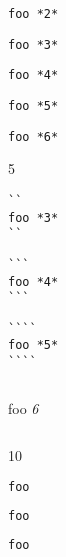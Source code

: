 
\def\mytitle{Advanced Fenced Code Blocks}


\texttt{foo *2*}

\begin{verbatim}
foo *3*
\end{verbatim}

\begin{verbatim}
foo *4*
\end{verbatim}

\begin{verbatim}
foo *5*
\end{verbatim}

\begin{verbatim}
foo *6*
\end{verbatim}

5

\begin{verbatim}
``
foo *3*
``
\end{verbatim}

\begin{verbatim}
```
foo *4*
```
\end{verbatim}

\begin{verbatim}
````
foo *5*
````
\end{verbatim}

\begin{verbatim}
\end{verbatim}

foo \emph{6}

\begin{verbatim}
\end{verbatim}

10

\begin{lstlisting}[language=perl]
foo
\end{lstlisting}

\begin{lstlisting}[language=perl]
foo
\end{lstlisting}

\begin{lstlisting}[language=perl]
foo
\end{lstlisting}



